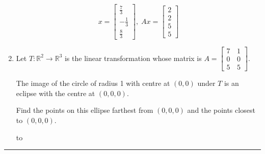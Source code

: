 \documentclass[11pt]{article}
\newcommand{\hdotrule}[1]{\hbox to \textwidth{\leaders\hbox to #1pt{\hss . \hss}\hfil}}
\begin{document}
\begin{preview}
\begin{enumerate}
            $$x=\begin{bmatrix}\frac{7}{3}\\-\frac{1}{3}\\\frac{8}{3}\end{bmatrix},\; Ax= \begin{bmatrix}2\\2\\5\\5\end{bmatrix}$$
            
            \setcounter{enumi}{4}
            \item Let $T : \mathbb{R}^2 \rightarrow \mathbb{R}^3$ is the linear transformation whose matrix is $A = \begin{bmatrix}
                  7 &\, 1 \\ 0 &\, 0 \\ 5 &\, 5 
            \end{bmatrix}$. 
            
            The image of the circle of radius 1 with centre at $(0,0)$ under $T$ is an eclipse with the centre at $(0,0,0)$. 
            
            Find the points on this ellipse farthest from $(0,0,0)$ and the points closest to $(0,0,0)$.

            \hdotrule{5}

      \end{enumerate}
      \hrule
\end{preview}
\end{document}
